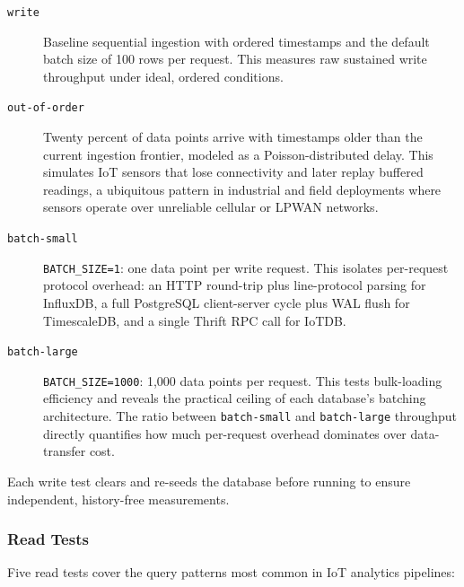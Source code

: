 \begin{description}
  \item[\texttt{write}] Baseline sequential ingestion with ordered timestamps and the
    default batch size of 100 rows per request. This measures raw sustained write throughput
    under ideal, ordered conditions.

  \item[\texttt{out-of-order}] Twenty percent of data points arrive with timestamps older
    than the current ingestion frontier, modeled as a Poisson-distributed delay. This simulates
    IoT sensors that lose connectivity and later replay buffered readings, a ubiquitous
    pattern in industrial and field deployments where sensors operate over unreliable cellular
    or LPWAN networks.

  \item[\texttt{batch-small}] \texttt{BATCH\_SIZE=1}: one data point per write request.
    This isolates per-request protocol overhead: an HTTP round-trip plus line-protocol parsing
    for InfluxDB, a full PostgreSQL client-server cycle plus WAL flush for TimescaleDB, and a
    single Thrift RPC call for IoTDB.

  \item[\texttt{batch-large}] \texttt{BATCH\_SIZE=1000}: 1{,}000 data points per request.
    This tests bulk-loading efficiency and reveals the practical ceiling of each database's
    batching architecture. The ratio between \texttt{batch-small} and \texttt{batch-large}
    throughput directly quantifies how much per-request overhead dominates over data-transfer cost.
\end{description}

Each write test clears and re-seeds the database before running to ensure independent,
history-free measurements.

\subsubsection{Read Tests}

Five read tests cover the query patterns most common in IoT analytics pipelines:

